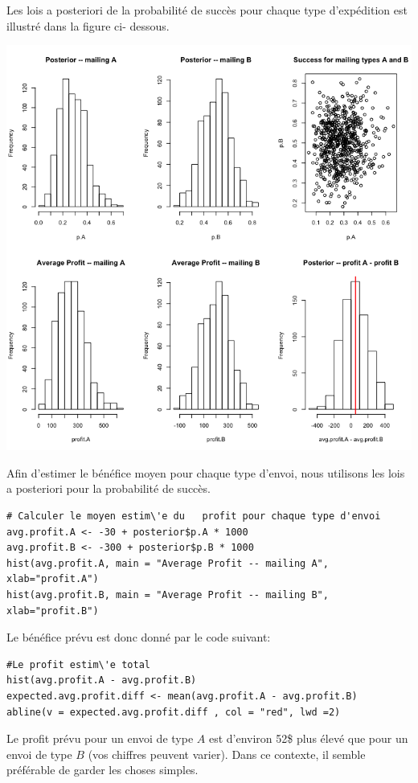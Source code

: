 \begin{Exemple}
Les lois a posteriori de la probabilit\'e de succ\`es pour chaque type d'exp\'edition est illustr\'e dans la figure ci- dessous.
\begin{center}
  \includegraphics[width=\linewidth]{Images/example12e.png}
\end{center}
Afin d'estimer le b\'en\'efice moyen pour chaque type d'envoi, nous utilisons les lois a posteriori pour la probabilit\'e de succ\`es.   
\begin{lstlisting}
# Calculer le moyen estim\'e du   profit pour chaque type d'envoi
avg.profit.A <- -30 + posterior$p.A * 1000 
avg.profit.B <- -300 + posterior$p.B * 1000 
hist(avg.profit.A, main = "Average Profit -- mailing A", xlab="profit.A") 
hist(avg.profit.B, main = "Average Profit -- mailing B", xlab="profit.B")
\end{lstlisting}
\noindent Le b\'en\'efice pr\'evu est donc donn\'e par le code suivant:
\begin{lstlisting}
#Le profit estim\'e total
hist(avg.profit.A - avg.profit.B)
expected.avg.profit.diff <- mean(avg.profit.A - avg.profit.B)
abline(v = expected.avg.profit.diff , col = "red", lwd =2)
\end{lstlisting}
Le profit pr\'evu pour un envoi de type $A$ est d'environ 52\$ plus \'elev\'e que pour un envoi de type $B$ (vos chiffres peuvent varier). Dans ce contexte, il semble pr\'ef\'erable de garder les choses simples.
\end{Exemple}


